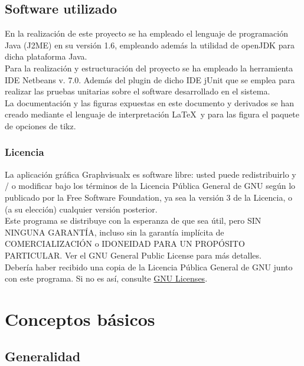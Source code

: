\documentclass[a4paper,12pt]{article}
\begin{document}
\subsection{Software utilizado}

En la realización de este proyecto se ha empleado el lenguaje de programación Java (J2ME) en su versión 1.6, empleando además la utilidad de openJDK para dicha plataforma Java.\\

Para la realización y estructuración del proyecto se ha empleado la herramienta IDE Netbeans v. 7.0. Además del plugin de dicho IDE jUnit que se emplea para realizar las pruebas unitarias sobre el software desarrollado en el sistema.\\

La documentación y las figuras expuestas en este documento y derivados se han creado mediante el lenguaje de interpretación \LaTeX\ y para las figura el paquete de opciones de tikz.\\

\subsubsection{Licencia}

La aplicación gráfica Graphvisualx es software libre: usted puede redistribuirlo y / o modificar bajo los términos de la Licencia Pública General de GNU según lo publicado por la Free Software Foundation, ya sea la versión 3 de la Licencia, o (a su elección) cualquier versión posterior.\\

Este programa se distribuye con la esperanza de que sea útil, pero SIN NINGUNA GARANTÍA, incluso sin la garantía implícita de COMERCIALIZACIÓN o IDONEIDAD PARA UN PROPÓSITO PARTICULAR. Ver el GNU General Public License para más detalles.\\

Debería haber recibido una copia de la Licencia Pública General de GNU junto con este programa. Si no es así, consulte \href{http://www.gnu.org/licenses/}{GNU Licenses}.\\

\section{Conceptos básicos}

\subsection{Generalidad}
\end{document}
